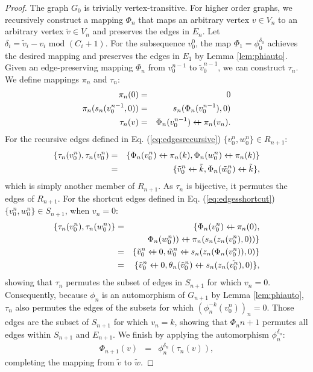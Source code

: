 \documentclass{article}
\newcommand{\beq}{\begin{eqnarray}}
\newcommand{\eeq}{\end{eqnarray}}
\newcommand{\append}{\leftarrow{\mkern-18mu}{+}\:}
\begin{document}
\begin{proof}
The graph $G_0$ is trivially vertex-transitive.
For higher order graphs,
we recursively construct a mapping $\Phi_n$
that maps an arbitrary vertex $v \in V_n$ to
an arbitrary vertex $\tilde{v} \in V_n$ and preserves the edges in $E_n$.
Let $\delta_i = \tilde{v}_i - v_i \mbox{ mod } (C_i + 1)$.
For the subsequence $v_0^0$, the map $\Phi_1 = \phi_0^{\delta_0}$
achieves the desired mapping and preserves the edges in $E_1$ by
Lemma \ref{lem:phiauto}.
Given an edge-preserving mapping $\Phi_n$
from $v_0^{n-1}$ to $\tilde{v}_0^{n-1}$,
we can construct $\tau_{n}$.
We define mappings $\pi_n$ and $\tau_{n}$:
\beq
\pi_n(0) &=& 0
\\
\pi_n(s_n(v_0^{n-1}, 0))
&=& s_n(\Phi_n(v_0^{n-1}), 0)
\\
\tau_{n}(v)
&=& \Phi_{n}(v_0^{n-1}) \append \pi_n(v_n).
\eeq
For the recursive edges defined in Eq. (\ref{eq:edgesrecursive})
$\{v_0^n, w_0^n\} \in R_{n+1}$:
\beq
\{ \tau_{n}(v_0^n), \tau_{n}(v_0^n)
&=&
\{ \Phi_n(v_0^n) \append \pi_n(k), \Phi_n(w_0^n) \append \pi_n(k)\}
\\ &=&
\{ \tilde{v}_0^n \append \tilde{k}, \Phi_n(\tilde{w}_0^n) \append \tilde{k}\},
\eeq
which is simply another member of $R_{n+1}$.
As $\tau_{n}$ is bijective, it permutes the edges of $R_{n+1}$.
For the shortcut edges defined in Eq. (\ref{eq:edgesshortcut})
$\{v_0^n, w_0^n\} \in S_{n+1}$, when $v_n=0$:
\beq
\{\tau_{n}(v_0^n), \tau_{n}(w_0^n)\}
&=&
\{ \Phi_n(v_0^n) \append \pi_n(0),
\\ &&
\quad \Phi_n(w_0^n)) \append \pi_n(s_n(z_n(v_0^n), 0)) \}
\\ &=&
\{ \tilde{v}_0^n \append 0,
\tilde{w}_0^n \append s_n(z_n(\Phi_n(v_0^n)), 0) \}
\\ &=&
\{ \tilde{v}_0^n \append 0,
\theta_n(\tilde{v}_0^n) \append s_n(z_n(\tilde{v_0^n}), 0) \},
\eeq
showing that $\tau_{n}$ permutes the subset of edges in $S_{n+1}$ for which
$v_n=0$.
Consequently, because $\phi_n$ is an automorphism of $G_{n+1}$
by Lemma \ref{lem:phiauto}, $\tau_{n}$ also permutes the edges of the
subsets for which $(\phi_n^{-k}(v_0^n))_n=0$.
Those edges are the subset of $S_{n+1}$ for which $v_n=k$,
showing that $\Phi_n{n+1}$ permutes all edges within $S_{n+1}$ and
$E_{n+1}$.
We finish by applying the automorphism $\phi_n^{\delta_n}$:
\beq
\Phi_{n+1}(v) &=& \phi_n^{\delta_n}(\tau_{n}(v)),
\eeq
completing the mapping from $\tilde{v}$ to $\tilde{w}$.
\end{proof}


\end{document}
